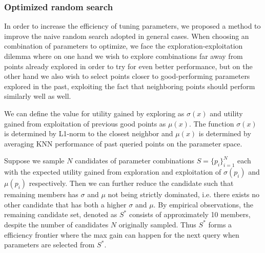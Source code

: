 \documentclass{article}
\begin{document}
\subsubsection*{Optimized random search}
In order to increase the efficiency of tuning parameters, we proposed a method to improve the naive random search adopted in general cases. When choosing an combination of parameters to optimize, we face the exploration-exploitation dilemma where on one hand we wish to explore combinations far away from points already explored in order to try for even better performance, but on the other hand we also wish to select points closer to good-performing parameters explored in the past, exploiting the fact that neighboring points should perform similarly well as well. 


We can define the value for utility gained by exploring as $\sigma(x)$ and utility gained from exploitation of previous good points as $\mu(x)$. The function $\sigma(x)$ is determined by L1-norm to the closest neighbor and $\mu(x)$ is determined by averaging KNN performance of past queried points on the parameter space.

Suppose we sample $N$ candidates of parameter combinations $S = \{p_i\}_{i=1}^N$ each with the expected utility gained from exploration and exploitation of $\sigma(p_i)$ and $\mu(p_i)$ respectively. Then we can further reduce the candidate such that remaining members has $\sigma$ and $\mu$ not being strictly dominated, i.e. there exists no other candidate that has both a higher $\sigma$ and $\mu$. By empirical observations, the remaining candidate set, denoted as $S^*$ consists of approximately 10 members, despite the number of candidates $N$ originally sampled. Thus $S^*$ forms a efficiency frontier where the max gain can happen for the next query when parameters are selected from $S^*$.
\end{document}
